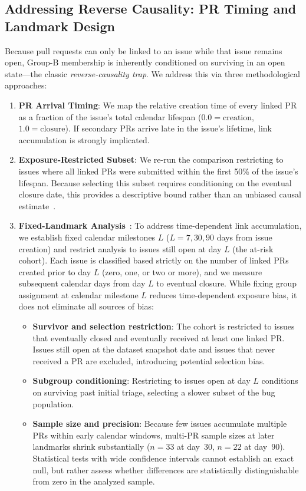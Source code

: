 \subsection{Addressing Reverse Causality: PR Timing and Landmark Design}\label{sec:landmarkdesign}
Because pull requests can only be linked to an issue while that issue remains open, Group-B membership is inherently conditioned on surviving in an open state—the classic \emph{reverse-causality trap}. We address this via three methodological approaches:
\begin{enumerate}
  \item \textbf{PR Arrival Timing}: We map the relative creation time of every linked PR as a fraction of the issue's total calendar lifespan ($0.0 = \text{creation}$, $1.0 = \text{closure}$). If secondary PRs arrive late in the issue's lifetime, link accumulation is strongly implicated.
  \item \textbf{Exposure-Restricted Subset}: We re-run the comparison restricting to issues where all linked PRs were submitted within the first 50\% of the issue's lifespan. Because selecting this subset requires conditioning on the eventual closure date, this provides a descriptive bound rather than an unbiased causal estimate~\cite{vanhouwelingen2006landmark}.
  \item \textbf{Fixed-Landmark Analysis}~\cite{vanhouwelingen2006landmark}: To address time-dependent link accumulation, we establish fixed calendar milestones $L$ ($L=7, 30, 90$ days from issue creation) and restrict analysis to issues still open at day $L$ (the at-risk cohort). Each issue is classified based strictly on the number of linked PRs created prior to day $L$ (zero, one, or two or more), and we measure subsequent calendar days from day $L$ to eventual closure. While fixing group assignment at calendar milestone $L$ reduces time-dependent exposure bias, it does not eliminate all sources of bias:
    \begin{itemize}
      \item \textbf{Survivor and selection restriction}: The cohort is restricted to issues that eventually closed and eventually received at least one linked PR. Issues still open at the dataset snapshot date and issues that never received a PR are excluded, introducing potential selection bias.
      \item \textbf{Subgroup conditioning}: Restricting to issues open at day $L$ conditions on surviving past initial triage, selecting a slower subset of the bug population.
      \item \textbf{Sample size and precision}: Because few issues accumulate multiple PRs within early calendar windows, multi-PR sample sizes at later landmarks shrink substantially ($n=33$ at day~30, $n=22$ at day~90). Statistical tests with wide confidence intervals cannot establish an exact null, but rather assess whether differences are statistically distinguishable from zero in the analyzed sample.
    \end{itemize}
\end{enumerate}
